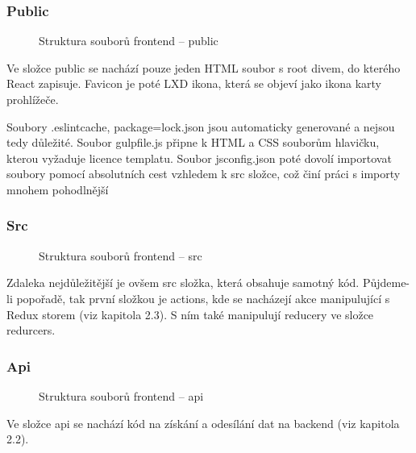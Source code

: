 \documentclass[a4paper,oneside,12pt]{report}
\begin{document}
\newpage
\subsubsection{Public}

\begin{figure}[h]
	\caption[Struktura souborů frontendu -- public, vlastní tvorba]{Struktura souborů frontend -- public}
	\label{fig:frontendStructure}
\end{figure}
Ve složce public se nachází pouze jeden HTML soubor s root divem, do kterého React zapisuje.
Favicon je poté LXD ikona, která se objeví jako ikona karty prohlížeče.

Soubory .eslintcache, package=lock.json jsou automaticky generované a nejsou tedy důležité.
Soubor gulpfile.js připne k HTML a CSS souborům hlavičku, kterou vyžaduje licence templatu.
Soubor jsconfig.json poté dovolí importovat soubory pomocí absolutních cest vzhledem k src složce, což činí práci s importy mnohem pohodlnější

\subsubsection{Src}
\begin{figure}[h]
	\caption[Struktura souborů frontendu, vlastní tvorba -- src]{Struktura souborů frontend -- src}
	\label{fig:frontendStructureSrc}
\end{figure}
Zdaleka nejdůležitější je ovšem src složka, která obsahuje samotný kód.
Půjdeme-li popořadě, tak první složkou je actions, kde se nacházejí akce manipulující s Redux storem (viz kapitola 2.3).
S ním také manipulují reducery ve složce redurcers.


\newpage
\subsubsection{Api}


\begin{figure}[h]
	\caption[Struktura souborů frontendu -- api, vlastní tvorba]{Struktura souborů frontend -- api}
	\label{fig:frontendStructureApi}
\end{figure}
Ve složce api se nachází kód na získání a odesílání dat na backend (viz kapitola 2.2).
\end{document}
